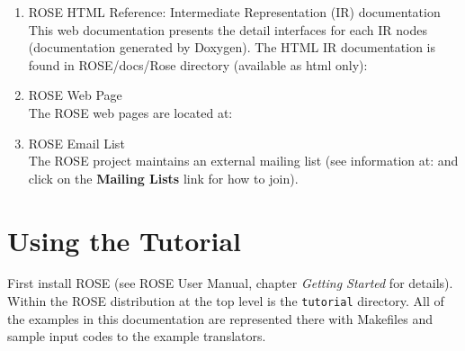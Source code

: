 \begin{enumerate}

     \item ROSE HTML Reference: Intermediate Representation (IR) documentation \\
           This web documentation presents the detail interfaces for each IR nodes
           (documentation generated by Doxygen).
           The HTML IR documentation is found in ROSE/docs/Rose directory 
           (available as html only): \\

     \item ROSE Web Page \\
       The ROSE web pages are located at:

     \item ROSE Email List \\
           The ROSE project maintains an external mailing list (see information at:
            and click on the
           {\bf Mailing Lists} link for how to join).
\end{enumerate}


\section{Using the Tutorial}

    First install ROSE (see ROSE User Manual, chapter {\em Getting Started} for details).
Within the ROSE distribution at the top level is the {\tt tutorial} directory.
All of the examples in this documentation are represented there with Makefiles and
sample input codes to the example translators.

